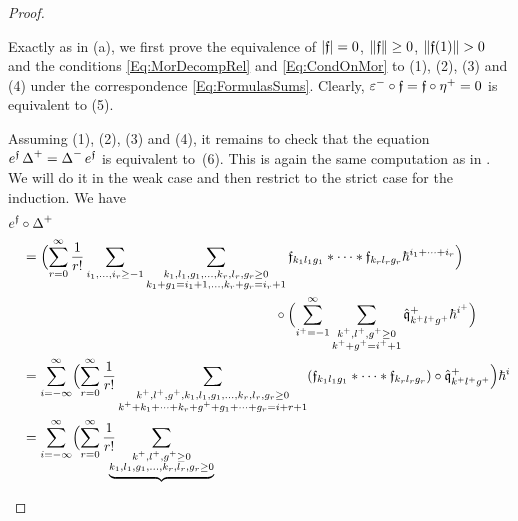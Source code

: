 \documentclass[\MainFolder/Text.tex]{subfiles}
\begin{document}
\begin{proof}
\begin{ProofList}
\item Exactly as in (a), we first prove the equivalence of $|\mathfrak{f}| = 0$, $\| \mathfrak{f} \| \ge 0$, $\Norm{\MVMorF(1)}>0$ and the conditions \eqref{Eq:MorDecompRel} and \eqref{Eq:CondOnMor} to (1), (2), (3) and (4) under the correspondence \eqref{Eq:FormulasSums}. Clearly, $\varepsilon^- \circ \mathfrak{f} = \mathfrak{f} \circ \eta^+ = 0$ is equivalent to (5). 

Assuming (1), (2), (3) and (4), it remains to check that the equation $e^{\mathfrak{f}} \operatorname{\Delta}^+ = \operatorname{\Delta}^- e^{\mathfrak{f}}$ is equivalent to~(6). This is again the same computation as in \cite[Section~2]{Cieliebak2015}. We will do it in the weak case and then restrict to the strict case for the induction. We have
\begin{align*}
& e^\MVMorF \circ \BVOp^+ \\ 
&\quad = \begin{multlined}[t] \Bigl(\sum_{r=0}^\infty \frac{1}{r!} \sum_{i_1, \dotsc, i_r \ge -1} \sum_{\substack{k_1, l_1, g_1, \dotsc, k_r,l_r,g_r \ge 0\\ k_1 + g_1 = i_1 + 1, \dotsc, k_r + g_r = i_r + 1}}\HTP_{k_1 l_1 g_1}\Star \dotsb \Star \HTP_{k_r l_r g_r} \hbar^{i_1 + \dotsb + i_r}\Bigr)\\\circ\Bigl(\sum_{i^+ = -1}^\infty \sum_{\substack{k^+, l^+, g^+ \ge 0\\k^+ + g^+ = i^+ + 1}} \hat{\OPQ}^+_{k^+ l^+ g^+}\hbar^{i^+}\Bigr)\end{multlined}
\\
&\quad =\sum_{i=-\infty}^\infty\Bigl(\sum_{r=0}^\infty\frac{1}{r!}\sum_{{\substack{k^+, l^+, g^+, k_1, l_1, g_1, \dotsc, k_r,l_r,g_r \ge 0 \\
k^+ + k_1 + \dotsb + k_r + g^+ + g_1 + \dotsb + g_r = i + r + 1 }}}(\HTP_{k_1 l_1 g_1}\Star \dotsb \Star \HTP_{k_r l_r g_r})\circ\hat{\OPQ}_{k^+l^+g^+}^+\Bigr)\hbar^i
 \\
&\quad =\sum_{i=-\infty}^\infty\Bigl(\sum_{r=0}^\infty\frac{1}{r!} \!\!\!\!\underbrace{\sum_{\substack{k^+, l^+, g^+\ge 0 \\ k_1, l_1, g_1, \dotsc, k_r,l_r,g_r \ge 0 \\
}}}
\end{align*}
\end{ProofList}
\end{proof}
\end{document}
